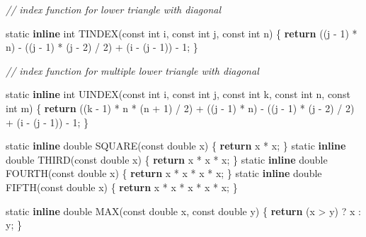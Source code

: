 \documentclass[12pt,]{article}
\newenvironment{Shaded}{\begin{snugshade}}{\end{snugshade}}
\newcommand{\CommentTok}[1]{\textcolor[rgb]{0.56,0.35,0.01}{\textit{#1}}}
\newcommand{\ControlFlowTok}[1]{\textcolor[rgb]{0.13,0.29,0.53}{\textbf{#1}}}
\newcommand{\DataTypeTok}[1]{\textcolor[rgb]{0.13,0.29,0.53}{#1}}
\newcommand{\DecValTok}[1]{\textcolor[rgb]{0.00,0.00,0.81}{#1}}
\newcommand{\KeywordTok}[1]{\textcolor[rgb]{0.13,0.29,0.53}{\textbf{#1}}}
\newcommand{\NormalTok}[1]{#1}
\begin{document}
\begin{Shaded}
\begin{Highlighting}[]
\CommentTok{// index function for lower triangle with diagonal}

\DataTypeTok{static} \KeywordTok{inline} \DataTypeTok{int}\NormalTok{ TINDEX(}\DataTypeTok{const} \DataTypeTok{int}\NormalTok{ i, }\DataTypeTok{const} \DataTypeTok{int}\NormalTok{ j, }\DataTypeTok{const} \DataTypeTok{int}\NormalTok{ n) \{}
  \ControlFlowTok{return}\NormalTok{ ((j - }\DecValTok{1}\NormalTok{) * n) - ((j - }\DecValTok{1}\NormalTok{) * (j - }\DecValTok{2}\NormalTok{) / }\DecValTok{2}\NormalTok{) + (i - (j - }\DecValTok{1}\NormalTok{)) - }\DecValTok{1}\NormalTok{;}
\NormalTok{\}}

\CommentTok{// index function for multiple lower triangle with diagonal}

\DataTypeTok{static} \KeywordTok{inline} \DataTypeTok{int}\NormalTok{ UINDEX(}\DataTypeTok{const} \DataTypeTok{int}\NormalTok{ i, }\DataTypeTok{const} \DataTypeTok{int}\NormalTok{ j, }\DataTypeTok{const} \DataTypeTok{int}\NormalTok{ k, }\DataTypeTok{const} \DataTypeTok{int}\NormalTok{ n,}
                         \DataTypeTok{const} \DataTypeTok{int}\NormalTok{ m) \{}
  \ControlFlowTok{return}\NormalTok{ ((k - }\DecValTok{1}\NormalTok{) * n * (n + }\DecValTok{1}\NormalTok{) / }\DecValTok{2}\NormalTok{) + ((j - }\DecValTok{1}\NormalTok{) * n) - ((j - }\DecValTok{1}\NormalTok{) * (j - }\DecValTok{2}\NormalTok{) / }\DecValTok{2}\NormalTok{) +}
\NormalTok{         (i - (j - }\DecValTok{1}\NormalTok{)) - }\DecValTok{1}\NormalTok{;}
\NormalTok{\}}

\DataTypeTok{static} \KeywordTok{inline} \DataTypeTok{double}\NormalTok{ SQUARE(}\DataTypeTok{const} \DataTypeTok{double}\NormalTok{ x) \{ }\ControlFlowTok{return}\NormalTok{ x * x; \}}
\DataTypeTok{static} \KeywordTok{inline} \DataTypeTok{double}\NormalTok{ THIRD(}\DataTypeTok{const} \DataTypeTok{double}\NormalTok{ x) \{ }\ControlFlowTok{return}\NormalTok{ x * x * x; \}}
\DataTypeTok{static} \KeywordTok{inline} \DataTypeTok{double}\NormalTok{ FOURTH(}\DataTypeTok{const} \DataTypeTok{double}\NormalTok{ x) \{ }\ControlFlowTok{return}\NormalTok{ x * x * x * x; \}}
\DataTypeTok{static} \KeywordTok{inline} \DataTypeTok{double}\NormalTok{ FIFTH(}\DataTypeTok{const} \DataTypeTok{double}\NormalTok{ x) \{ }\ControlFlowTok{return}\NormalTok{ x * x * x * x * x; \}}

\DataTypeTok{static} \KeywordTok{inline} \DataTypeTok{double}\NormalTok{ MAX(}\DataTypeTok{const} \DataTypeTok{double}\NormalTok{ x, }\DataTypeTok{const} \DataTypeTok{double}\NormalTok{ y) \{}
  \ControlFlowTok{return}\NormalTok{ (x > y) ? x : y;}
\NormalTok{\}}


\end{Highlighting}
\end{Shaded}
\end{document}
